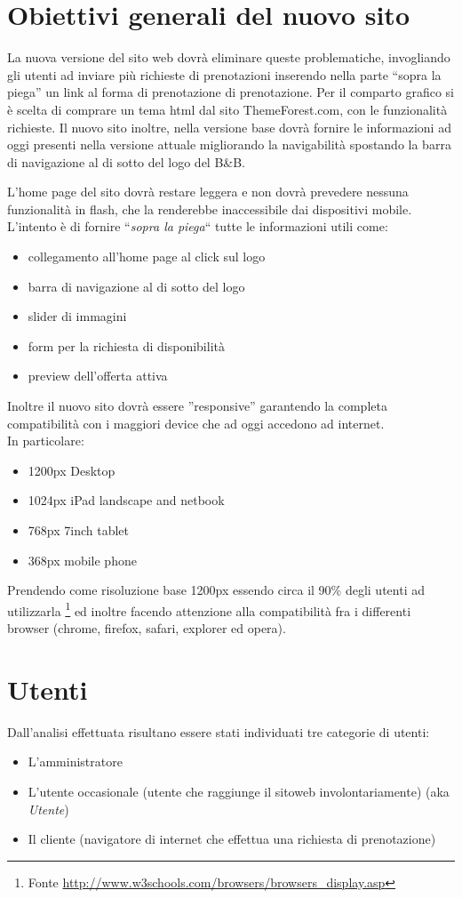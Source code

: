 \documentclass[a4paper,12pt,hidelinks]{report}
\begin{document}
\section{Obiettivi generali del nuovo sito}
La nuova versione del sito web dovrà eliminare queste problematiche, invogliando gli utenti ad inviare più richieste di prenotazioni inserendo nella parte ``sopra la piega'' un link
al forma di prenotazione di prenotazione.
Per il comparto grafico si è scelta di comprare un tema html dal sito ThemeForest.com, con le funzionalità richieste.
Il nuovo sito inoltre, nella versione base dovrà fornire le informazioni ad oggi presenti nella versione attuale migliorando la navigabilità spostando la barra di navigazione al di sotto 
del logo del B\&B.
\par L'home page del sito dovrà restare leggera e non dovrà prevedere nessuna funzionalità in flash, che la renderebbe inaccessibile dai dispositivi mobile.
L'intento è di fornire ``\textit{sopra la piega}`` tutte le informazioni utili come:
\begin{itemize}
 \item collegamento all'home page al click sul logo
 \item barra di navigazione al di sotto del logo
 \item slider di immagini
 \item form per la richiesta di disponibilità
 \item preview dell'offerta attiva
\end{itemize}
\par Inoltre il nuovo sito dovrà essere ''responsive'' garantendo la completa compatibilità con i maggiori device che ad oggi accedono ad internet.
\\In particolare:
\begin{itemize}
 \item 1200px Desktop
 \item 1024px iPad landscape and netbook
 \item 768px 7inch tablet
 \item 368px mobile phone
\end{itemize}
Prendendo come risoluzione base 1200px essendo circa il 90\% degli utenti ad utilizzarla \footnote{Fonte \url{http://www.w3schools.com/browsers/browsers_display.asp}}
ed inoltre facendo attenzione alla compatibilità fra i differenti browser (chrome, firefox, safari, explorer ed opera).

\section{Utenti}
Dall'analisi effettuata risultano essere stati individuati tre categorie di utenti:
\begin{itemize}
 \item L'amministratore
 \item L'utente occasionale (utente che raggiunge il sitoweb involontariamente) (aka \textit{Utente})
 \item Il cliente (navigatore di internet che effettua una richiesta di prenotazione)
\end{itemize}
\end{document}
